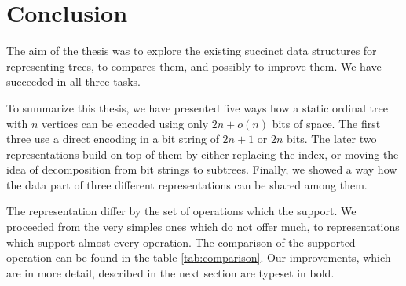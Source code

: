 \chapter*{Conclusion}

The aim of the thesis was to explore the existing succinct data structures for representing trees, to compares them, and possibly to improve them.
We have succeeded in all three tasks.

\bigbreak

To summarize this thesis, we have presented five ways how a static ordinal tree with $n$ vertices can be encoded using only $2n + o(n)$ bits of space.
The first three use a direct encoding in a bit string of $2n + 1$ or $2n$ bits.
The later two representations build on top of them by either replacing the index, or moving the idea of decomposition from bit strings to subtrees.
Finally, we showed a way how the data part of three different representations can be shared among them.

The representation differ by the set of operations which the support.
We proceeded from the very simples ones which do not offer much, to representations which support almost every operation.
The comparison of the supported operation can be found in the table \ref{tab:comparison}.
Our improvements, which are in more detail, described in the next section are typeset in bold.


